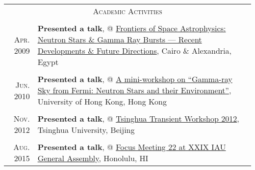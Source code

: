 \documentclass[10pt]{article}
\begin{document}
\begin{longtable}{r|p{16.5cm}}

    \multicolumn{2}{c}{\textsc{Academic Activities}}  \\
    \multicolumn{2}{c}{} \\

    \textsc{Apr. 2009}   &   \textbf{Presented a talk}, @ \href{http://www.ns-grb.com/index0.html}{Frontiers of Space Astrophysics: Neutron Stars \& Gamma Ray Bursts --- Recent Developments \& Future Directions}, Cairo \& Alexandria, Egypt     \\
    \multicolumn{2}{c}{} \\

    \textsc{Jun. 2010}   &   \textbf{Presented a talk}, @ \href{http://www.physics.hku.hk/~astro/2010Astro/Index.htm}{A mini-workshop on ``Gamma-ray Sky from Fermi: Neutron Stars and their Environment''}, University of Hong Kong, Hong Kong   \\
    \multicolumn{2}{c}{} \\

    \textsc{Nov. 2012}   &   \textbf{Presented a talk}, @ \href{http://www.thca.tsinghua.edu.cn/en/index.php/Workshop_programme}{Tsinghua Transient Workshop 2012}, Tsinghua University, Beijing   \\
    \multicolumn{2}{c}{} \\

    \textsc{Aug. 2015}   &   \textbf{Presented a talk}, @ \href{http://hffiau.epfl.ch/page-116896.html}{Focus Meeting 22 at XXIX IAU
General Assembly}, Honolulu, HI     \\

\end{longtable}
\end{document}
